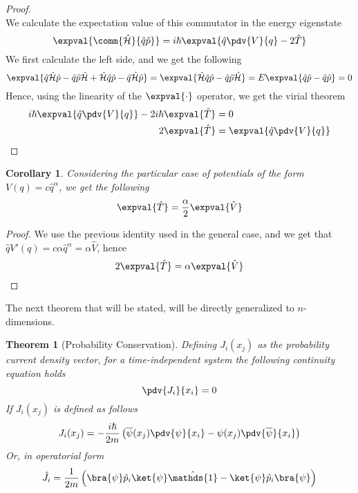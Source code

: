 \documentclass[a4paper, 11pt]{book}
\newcommand{\1}{\opr{\mathds{1}}}
\newcommand{\ham}{\mathcal{H}}
\newcommand{\opr}[1]{\hat{#1}}
\newtheorem{thm}{Theorem}
\theoremstyle{plain}
\newtheorem{cor}{Corollary}
\begin{document}
\begin{proof}
\begin{equation*}
		\end{equation*}
		We calculate the expectation value of this commutator in the energy eigenstate
		\begin{equation*}
			\expval{\comm{\opr{\ham}}{\opr{q}\opr{p}}}=i\hbar\expval{\opr{q}\pdv{V}{q}-2\opr{T}}
		\end{equation*}
		We first calculate the left side, and we get the following
		\begin{equation*}
			\expval{\opr{q}\opr{\ham}\opr{p}-\opr{q}\opr{p}\opr{\ham}+\opr{\ham}\opr{q}\opr{p}-\opr{q}\opr{\ham}\opr{p}}=\expval{\opr{\ham}\opr{q}\opr{p}-\opr{q}\opr{p}\opr{\ham}}=E\expval{\opr{q}\opr{p}-\opr{q}\opr{p}}=0
		\end{equation*}
		Hence, using the linearity of the $\expval{\cdot}$ operator, we get the virial theorem
		\begin{equation*}
			\begin{aligned}
				i\hbar\expval{\opr{q}\pdv{V}{q}}-2i\hbar\expval{\opr{T}}&=0\\
				2\expval{\opr{T}}&=\expval{\opr{q}\pdv{V}{q}}
			\end{aligned}
		\end{equation*}
	\end{proof}
	\begin{cor}
		Considering the particular case of potentials of the form $V(q)=c\opr{q}^{\alpha}$, we get the following
		\begin{equation*}
			\expval{\opr{T}}=\frac{\alpha}{2}\expval{\opr{V}}
		\end{equation*}
	\end{cor}
	\begin{proof}
		We use the previous identity used in the general case, and we get that $\opr{q}V'(q)=c\alpha\opr{q}^{\alpha}=\alpha\opr{V}$, hence
		\begin{equation*}
			2\expval{\opr{T}}=\alpha\expval{\opr{V}}
		\end{equation*}
	\end{proof}
	The next theorem that will be stated, will be directly generalized to $n$-dimensions.
	\begin{thm}[Probability Conservation]
		Defining $J_i(x_j)$ as the probability current density vector, for a time-independent system the following continuity equation holds
		\begin{equation*}
			\pdv{J_i}{x_i}=0
		\end{equation*}
		If $J_i(x_j)$ is defined as follows
		\begin{equation*}
			J_i(x_j)=-\frac{i\hbar}{2m}\left(\overline{\psi}(x_j)\pdv{\psi}{x_i}-\psi(x_j)\pdv{\overline{\psi}}{x_i}\right)
		\end{equation*}
		Or, in operatorial form
		\begin{equation*}
			\opr{J}_i=\frac{1}{2m}\left( \bra{\psi}\opr{p}_i\ket{\psi}\1-\ket{\psi}\opr{p}_i\bra{\psi} \right)
		\end{equation*}
	\end{thm}
\end{document}

